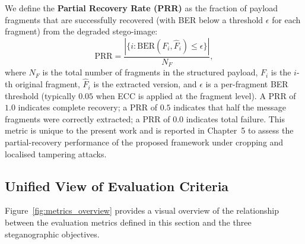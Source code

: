 \documentclass[12pt,a4paper,oneside]{report}
\begin{document}
	We define the \textbf{Partial Recovery Rate (PRR)} as the fraction of payload fragments that
	are successfully recovered (with BER below a threshold $\epsilon$ for each fragment) from the
	degraded stego-image:
	\begin{equation}
		\mathrm{PRR} = \frac{|\{i : \mathrm{BER}(F_i, \hat{F}_i) \leq \epsilon\}|}{N_F},
		\label{eq:prr}
	\end{equation}
	where $N_F$ is the total number of fragments in the structured payload, $F_i$ is the $i$-th
	original fragment, $\hat{F}_i$ is the extracted version, and $\epsilon$ is a per-fragment BER
	threshold (typically $0.05$ when ECC is applied at the fragment level). A PRR of $1.0$ indicates
	complete recovery; a PRR of $0.5$ indicates that half the message fragments were correctly
	extracted; a PRR of $0.0$ indicates total failure. This metric is unique to the present work
	and is reported in Chapter~5 to assess the partial-recovery performance of the proposed framework
	under cropping and localised tampering attacks.
	
	\subsection{Unified View of Evaluation Criteria}
	\label{subsec:unified_view}
	
	Figure~\ref{fig:metrics_overview} provides a visual overview of the relationship between the
	evaluation metrics defined in this section and the three steganographic objectives.
	
\end{document}
